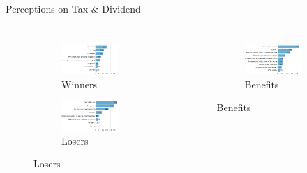 \documentclass[aspectratio=169,9pt,dvipsnames]{beamer}
\begin{document}
        \begin{frame}{Perceptions on Tax \& Dividend}

\vspace{-.3cm}
\begin{columns}
\begin{figure}[t]
\begin{subfigure}{\columnwidth}
   \caption{Winners}
   \includegraphics[width=.8\columnwidth]{Images/tax_winners_synchro.png}
\end{subfigure}

\begin{subfigure}{\columnwidth}
   \caption{Losers}
   \includegraphics[width=.8\columnwidth]{Images/tax_losers_synchro.png}
\end{subfigure}
\label{fig:winners_losers}
\end{figure}


\begin{figure}[t]
\centering
\begin{subfigure}{\columnwidth}
   \caption{Benefits}
   \includegraphics[width=.8\columnwidth]{Images/CC_benefits_synchro.png}
\end{subfigure}


\end{figure}
\end{columns}
\end{frame}
\end{document}
